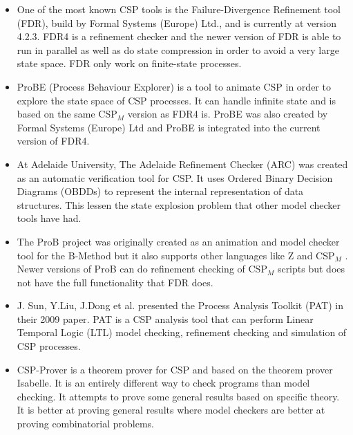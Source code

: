 \documentclass[a4paper]{report}
\newcommand{\cspm}{CSP$_M$ }
\begin{document}
\begin{itemize}
\item One of the most known CSP tools is the Failure-Divergence Refinement tool (FDR), build by Formal Systems (Europe) Ltd., and is currently at version 4.2.3\cite{fdr}. FDR4 is a refinement checker and the newer version of FDR is able to run in parallel as well as do state compression in order to avoid a very large state space. FDR only work on finite-state processes.
\item ProBE (Process Behaviour Explorer)\cite{probe} is a tool to animate CSP in order to explore the state space of CSP processes. It can handle infinite state and is based on the same \cspm{} version as FDR4 is. ProBE was also created by Formal Systems (Europe) Ltd and ProBE is integrated into the current version of FDR4.
\item At Adelaide University, The Adelaide Refinement Checker (ARC)\cite{Parashkevov1996} was created as an automatic verification tool for CSP. It uses Ordered Binary Decision Diagrams (OBDDs) to represent the internal representation of data structures. This lessen the state explosion problem that other model checker tools have had. 
\item The ProB project\cite{ProB}\cite{Leuschel2003} was originally created as an animation and model checker tool for the B-Method\cite{Abrial1988} but it also supports other languages like Z and \cspm{}. Newer versions of ProB can do refinement checking of \cspm{} scripts but does not have the full functionality that FDR does. 
\item J. Sun, Y.Liu, J.Dong et al. presented the Process Analysis Toolkit (PAT) in their 2009 paper\cite{Sun2009}. PAT is a CSP analysis tool that can perform Linear Temporal Logic (LTL) model checking, refinement checking and simulation of CSP processes. 
\item CSP-Prover\cite{Isobe2005} is a theorem prover for CSP and based on the theorem prover Isabelle. It is an entirely different way to check programs than model checking. It attempts to prove some general results based on specific theory. It is better at proving general results where model checkers are better at proving combinatorial problems. 
\end{itemize}
\end{document}
